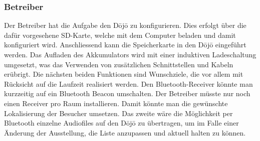 \subsubsection*{Betreiber} \label{sec:funktionBetreiber}
Der Betreiber hat die Aufgabe den Dōjō zu konfigurieren. Dies erfolgt über die dafür vorgesehene SD-Karte, welche mit dem Computer beladen und damit konfiguriert wird. Anschliessend kann die Speicherkarte in den Dōjō eingeführt werden. Das Aufladen des Akkumulators wird mit einer induktiven Ladeschaltung umgesetzt, was das Verwenden von zusätzlichen Schnittstellen und Kabeln erübrigt. Die nächsten beiden Funktionen sind Wunschziele, die vor allem mit Rücksicht auf die Laufzeit realisiert werden. Den Bluetooth-Receiver könnte man kurzzeitig auf ein Bluetooth Beacon umschalten. Der Betreiber müsste nur noch einen Receiver pro Raum installieren. Damit könnte man die gewünschte Lokalisierung der Besucher umsetzen. Das zweite wäre die Möglichkeit per Bluetooth einzelne Audiofiles auf den Dōjō zu übertragen, um im Falle einer Änderung der Ausstellung, die Liste anzupassen und aktuell halten zu können.
